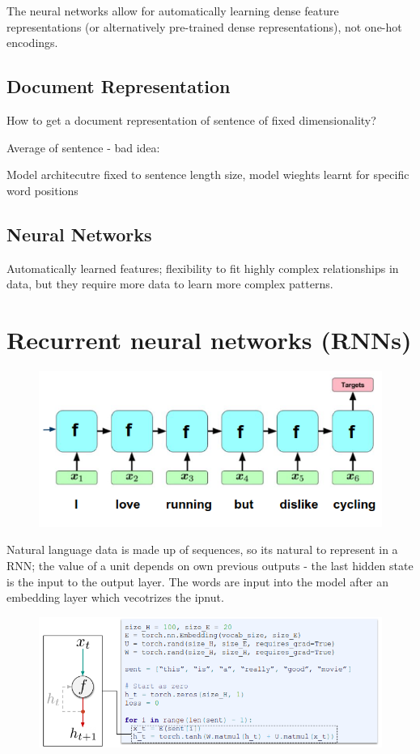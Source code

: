 \documentclass[11pt]{article}
\begin{document}
The neural networks allow for automatically learning dense feature representations (or alternatively pre-trained dense representations), not one-hot encodings.

\subsection{Document Representation}

How to get a document representation of sentence of
fixed dimensionality?

Average of sentence - bad idea:
    
Model architecutre fixed to sentence length size, model wieghts learnt for specific word positions

\subsection{Neural Networks}

Automatically learned features; flexibility to fit highly complex relationships in data, but they require more data to learn more complex patterns.

\section{Recurrent neural networks (RNNs)}

\begin{figure}[H]
    \centering
    \includegraphics[width=.6\linewidth]{figures/RNN.png}    
\end{figure}

Natural language data is made up of sequences, so its natural to represent in a RNN; the value of a unit depends on own previous outputs - the last hidden state is the input to the output layer. The words are input into the model after an embedding layer which vecotrizes the ipnut.

\begin{figure}[H]
    \centering
    \includegraphics[width=.6\linewidth]{figures/VanillaRNN.png}    
\end{figure}
\end{document}
